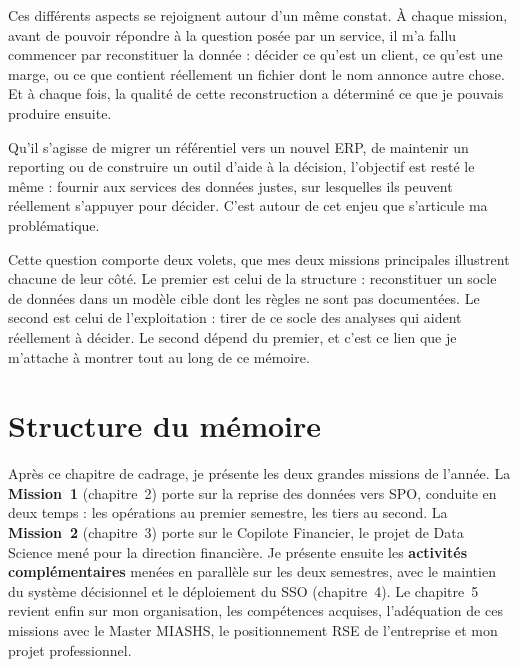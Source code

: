 Ces différents aspects se rejoignent autour d'un même constat. À chaque mission, avant de
pouvoir répondre à la question posée par un service, il m'a fallu commencer par reconstituer la
donnée : décider ce qu'est un client, ce qu'est une marge, ou ce que contient réellement un
fichier dont le nom annonce autre chose. Et à chaque fois, la qualité de cette reconstruction a
déterminé ce que je pouvais produire ensuite.

Qu'il s'agisse de migrer un référentiel vers un nouvel ERP, de maintenir un reporting ou de
construire un outil d'aide à la décision, l'objectif est resté le même : fournir aux services
des données justes, sur lesquelles ils peuvent réellement s'appuyer pour décider. C'est autour
de cet enjeu que s'articule ma problématique.

\begin{center}
\end{center}

Cette question comporte deux volets, que mes deux missions principales illustrent chacune de
leur côté. Le premier est celui de la structure : reconstituer un socle de données dans un
modèle cible dont les règles ne sont pas documentées. Le second est celui de l'exploitation :
tirer de ce socle des analyses qui aident réellement à décider. Le second dépend du premier,
et c'est ce lien que je m'attache à montrer tout au long de ce mémoire.

\section{Structure du mémoire}

Après ce chapitre de cadrage, je présente les deux grandes missions de l'année. La
\textbf{Mission~1} (chapitre~2) porte sur la reprise des données vers SPO, conduite en deux
temps : les opérations au premier semestre, les tiers au second. La \textbf{Mission~2}
(chapitre~3) porte sur le Copilote Financier, le projet de Data Science mené pour la direction
financière. Je présente ensuite les \textbf{activités complémentaires} menées en parallèle sur
les deux semestres, avec le maintien du système décisionnel et le déploiement du SSO
(chapitre~4). Le chapitre~5 revient enfin sur mon organisation, les compétences acquises,
l'adéquation de ces missions avec le Master MIASHS, le positionnement RSE de l'entreprise et
mon projet professionnel.

